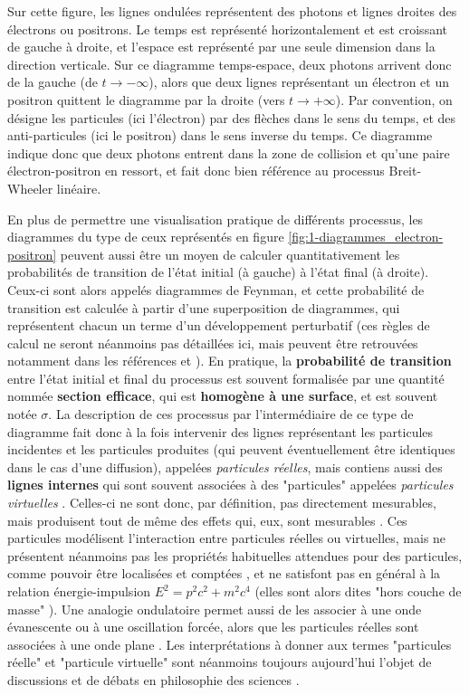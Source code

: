 \begin{refsection}
Sur cette figure, les lignes ondulées représentent des photons et lignes droites des électrons ou positrons. Le temps est représenté horizontalement et est croissant de gauche à droite, et l'espace est représenté par une seule dimension dans la direction verticale. Sur ce diagramme temps-espace, deux photons arrivent donc de la gauche (de $t \to - \infty$), alors que deux lignes représentant un électron et un positron quittent le diagramme par la droite (vers $t \to + \infty$). Par convention, on désigne les particules (ici l'électron) par des flèches dans le sens du temps, et des anti-particules (ici le positron) dans le sens inverse du temps. Ce diagramme indique donc que deux photons entrent dans la zone de collision et qu'une paire électron-positron en ressort, et fait donc bien référence au processus Breit-Wheeler linéaire. 

En plus de permettre une visualisation pratique de différents processus, les diagrammes du type de ceux représentés en figure \ref{fig:1-diagrammes_electron-positron} peuvent aussi être un moyen de calculer quantitativement les probabilités de transition de l'état initial (à gauche) à l'état final (à droite). Ceux-ci sont alors appelés diagrammes de Feynman, et cette probabilité de transition est calculée à partir d'une superposition de diagrammes, qui représentent chacun un terme d'un développement perturbatif (ces règles de calcul ne seront néanmoins pas détaillées ici, mais peuvent être retrouvées notamment dans les références \parencite{klauber_2015} et \parencite{greiner_2009}). En pratique, la \textbf{probabilité de transition} entre l'état initial et final du processus est souvent formalisée par une quantité nommée \textbf{section efficace}, qui est \textbf{homogène à une surface}, et est souvent notée $\sigma$. La description de ces processus par l'intermédiaire de ce type de diagramme fait donc à la fois intervenir des lignes représentant les particules incidentes et les particules produites (qui peuvent éventuellement être identiques dans le cas d'une diffusion), appelées \textit{particules réelles}, mais contiens aussi des \textbf{lignes internes} qui sont souvent associées à des "particules" appelées \textit{particules virtuelles} \parencite{jaeger_2019}. Celles-ci ne sont donc, par définition, pas directement mesurables, mais produisent tout de même des effets qui, eux, sont mesurables \parencite{jaeger_2019}. Ces particules modélisent l'interaction entre particules réelles ou virtuelles, mais ne présentent néanmoins pas les propriétés habituelles attendues pour des particules, comme pouvoir être localisées et comptées \parencite{teller_1997}, et ne satisfont pas en général à la relation énergie-impulsion $E^2 = p^2 c^2 + m^2 c^4$ (elles sont alors dites "hors couche de masse" \parencite{jaeger_2019}). Une analogie ondulatoire permet aussi de les associer à une onde évanescente ou à une oscillation forcée, alors que les particules réelles sont associées à une onde plane \parencite{lawson_1970}. Les interprétations à donner aux termes "particules réelle" et "particule virtuelle" sont néanmoins toujours aujourd'hui l'objet de discussions et de débats en philosophie des sciences \parencite{teller_1997, kuhlmann_2018, marburger_1996, jaeger_2019}.


\end{refsection}
